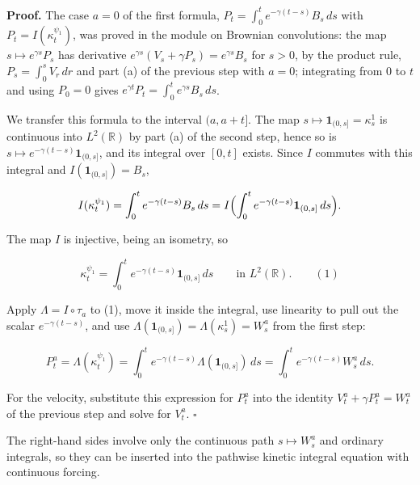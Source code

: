 \documentclass[11pt,a4paper]{article}
\begin{document}
\textbf{Proof.} The case \(a=0\) of the first formula, \(P_t=\int_0^te^{-\gamma(t-s)}B_s\,ds\) with \(P_t=I(\kappa^{\psi_1}_t)\), was proved in the module on Brownian convolutions: the map \(s\mapsto e^{\gamma s}P_s\) has derivative \(e^{\gamma s}(V_s+\gamma P_s)=e^{\gamma s}B_s\) for \(s>0\), by the product rule, \(P_s=\int_0^sV_r\,dr\) and part (a) of the previous step with \(a=0\); integrating from \(0\) to \(t\) and using \(P_0=0\) gives \(e^{\gamma t}P_t=\int_0^te^{\gamma s}B_s\,ds\).




We transfer this formula to the interval \((a,a+t]\). The map \(s\mapsto\mathbf 1_{(0,s]}=\kappa^1_s\) is continuous into \(L^2(\mathbb R)\) by part (a) of the second step, hence so is \(s\mapsto e^{-\gamma(t-s)}\mathbf 1_{(0,s]}\), and its integral over \([0,t]\) exists. Since \(I\) commutes with this integral and \(I(\mathbf 1_{(0,s]})=B_s\),


\[I(\kappa^{\psi_1}_t)=\int_0^te^{-\gamma(t-s)}B_s\,ds=I\Bigl(\int_0^te^{-\gamma(t-s)}\mathbf 1_{(0,s]}\,ds\Bigr).\]


The map \(I\) is injective, being an isometry, so


\[\kappa^{\psi_1}_t=\int_0^te^{-\gamma(t-s)}\mathbf 1_{(0,s]}\,ds\qquad\text{in }L^2(\mathbb R).\qquad(1)\]


Apply \(\Lambda=I\circ\tau_a\) to (1), move it inside the integral, use linearity to pull out the scalar \(e^{-\gamma(t-s)}\), and use \(\Lambda(\mathbf 1_{(0,s]})=\Lambda(\kappa^1_s)=W^a_s\) from the first step:


\[P^a_t=\Lambda(\kappa^{\psi_1}_t)=\int_0^te^{-\gamma(t-s)}\Lambda(\mathbf 1_{(0,s]})\,ds=\int_0^te^{-\gamma(t-s)}W^a_s\,ds .\]


For the velocity, substitute this expression for \(P^a_t\) into the identity \(V^a_t+\gamma P^a_t=W^a_t\) of the previous step and solve for \(V^a_t\). \(\square\)




The right-hand sides involve only the continuous path \(s\mapsto W^a_s\) and ordinary integrals, so they can be inserted into the pathwise kinetic integral equation with continuous forcing.
\end{document}
